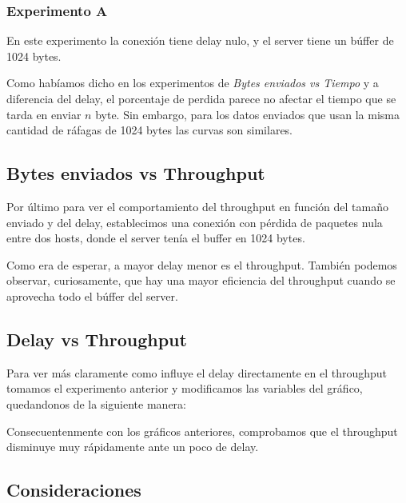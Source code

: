 \subsubsection{Experimento A}

  En este experimento la conexi\'on tiene delay nulo, y el server tiene un b\'uffer de 1024 bytes. 
  
  
  Como hab\'iamos dicho en los experimentos de \textit{Bytes enviados vs Tiempo} y a diferencia del delay, el porcentaje de perdida parece no afectar el tiempo que se tarda en enviar $n$ byte. Sin embargo, para los datos enviados que usan la misma cantidad de r\'afagas de 1024 bytes las curvas son similares. 

\subsection{Bytes enviados vs Throughput}
  Por \'ultimo para ver el comportamiento del throughput en funci\'on del tama\~no enviado y del delay, establecimos una conexi\'on con p\'erdida de paquetes nula entre dos hosts, donde el server ten\'ia el buffer en 1024 bytes. 

  
  Como era de esperar, a mayor delay menor es el throughput. Tambi\'en podemos observar, curiosamente, que hay una mayor eficiencia del throughput cuando se aprovecha todo el b\'uffer del server. 
  
\subsection{Delay vs Throughput}
  
  Para ver m\'as claramente como influye el delay directamente en el throughput tomamos el experimento anterior y modificamos las variables del gr\'afico, quedandonos de la siguiente manera: 
  
  
  Consecuentenmente con los gr\'aficos anteriores, comprobamos que el throughput disminuye muy r\'apidamente ante un poco de delay. 
  
\subsection{Consideraciones}
  
